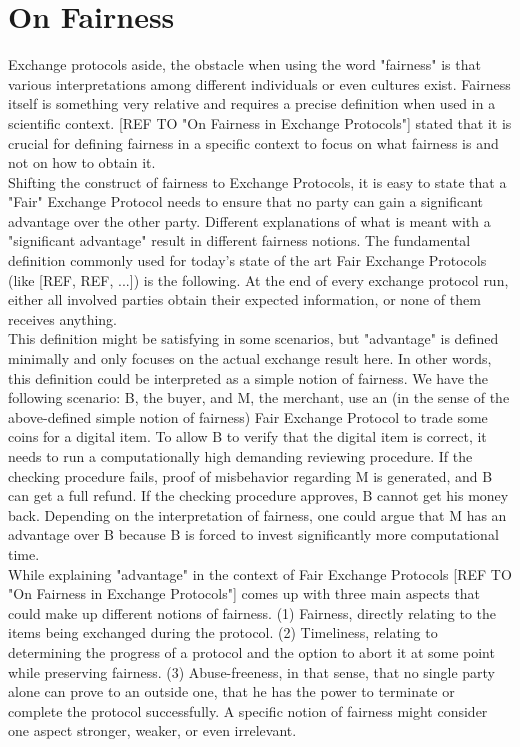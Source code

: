 \documentclass{cacthesis}
\begin{document}
		\section{On Fairness}
		Exchange protocols aside, the obstacle when using the word "fairness" is that various interpretations among different individuals or even cultures exist. Fairness itself is something very relative and requires a precise definition when used in a scientific context. [REF TO "On Fairness in Exchange Protocols"] stated that it is crucial for defining fairness in a specific context to focus on what fairness is and not on how to obtain it. \\
        Shifting the construct of fairness to Exchange Protocols, it is easy to state that a "Fair" Exchange Protocol needs to ensure that no party can gain a significant advantage over the other party. Different explanations of what is meant with a "significant advantage" result in different fairness notions.
        The fundamental definition commonly used for today's state of the art Fair Exchange Protocols (like [REF, REF, ...]) is the following. At the end of every exchange protocol run, either all involved parties obtain their expected information, or none of them receives anything. \\
        This definition might be satisfying in some scenarios, but "advantage" is defined minimally and only focuses on the actual exchange result here. In other words, this definition could be interpreted as a simple notion of fairness. We have the following scenario: B, the buyer, and M, the merchant, use an (in the sense of the above-defined simple notion of fairness) Fair Exchange Protocol to trade some coins for a digital item. To allow B to verify that the digital item is correct, it needs to run a computationally high demanding reviewing procedure. If the checking procedure fails, proof of misbehavior regarding M is generated, and B can get a full refund. If the checking procedure approves, B cannot get his money back.
        Depending on the interpretation of fairness, one could argue that M has an advantage over B because B is forced to invest significantly more computational time.  \\
        While explaining "advantage" in the context of Fair Exchange Protocols [REF TO "On Fairness in Exchange Protocols"] comes up with three main aspects that could make up different notions of fairness. (1) Fairness, directly relating to the items being exchanged during the protocol. (2) Timeliness, relating to determining the progress of a protocol and the option to abort it at some point while preserving fairness. (3) Abuse-freeness, in that sense, that no single party alone can prove to an outside one, that he has the power to terminate or complete the protocol successfully. A specific notion of fairness might consider one aspect stronger, weaker, or even irrelevant. \\
\end{document}
